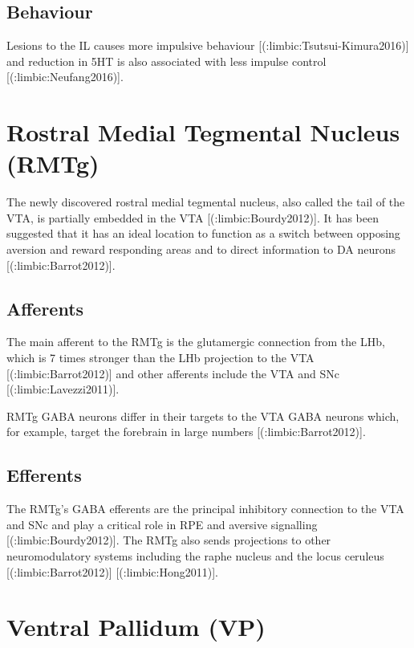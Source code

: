 {{\subsection{Behaviour}
Lesions to the IL causes more impulsive behaviour [(:limbic:Tsutsui-Kimura2016)] and reduction in 5HT is also associated with less impulse control [(:limbic:Neufang2016)].



\section{Rostral Medial Tegmental Nucleus (RMTg) }

The newly discovered rostral medial tegmental nucleus, also called the tail of
the VTA, is partially embedded in the VTA [(:limbic:Bourdy2012)]. It has been suggested that it has
an ideal location to function as a switch between opposing aversion and reward
responding areas and to direct information to DA neurons [(:limbic:Barrot2012)].

\subsection{Afferents}

The main afferent to the RMTg is the glutamergic connection from the LHb, which is 7 times
stronger than the LHb projection to the VTA [(:limbic:Barrot2012)] and other afferents include
the VTA and SNc [(:limbic:Lavezzi2011)].

RMTg GABA neurons differ in their targets to the VTA GABA neurons which, for example, target the forebrain in large numbers [(:limbic:Barrot2012)]. 

\subsection{Efferents}

The RMTg’s GABA efferents are the principal inhibitory connection to the VTA and SNc and play a critical role in RPE and aversive signalling [(:limbic:Bourdy2012)]. The RMTg also sends projections to other neuromodulatory systems including the raphe nucleus and the locus ceruleus [(:limbic:Barrot2012)] [(:limbic:Hong2011)].



\section{Ventral Pallidum (VP)}

}}
